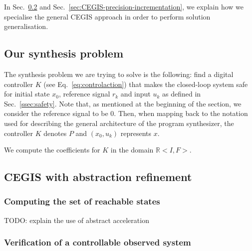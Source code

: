 \documentclass[runningheads,a4paper]{llncs}
\newcommand{\todo}[1]{{\color{red} TODO: #1}}
\begin{document}
In Sec.~\ref{sec:CEGIS-abstraction-refinement} and 
Sec.~\ref{sec:CEGIS-precision-incrementation}, we explain how we 
specialise the general CEGIS approach in order to perform solution generalisation.

\subsection{Our synthesis problem}
The synthesis problem we are trying to solve is the following:
find a digital controller $K$ (see Eq.~\ref{eq:controlaction})
that makes the closed-loop system safe for 
initial state $x_0$, reference signal $r_k$ and input $u_k$
as defined in Sec.~\ref{ssec:safety}. Note that, 
as mentioned at the beginning of the section, 
we consider the reference signal to be 0.
Then, when mapping back to the notation used for describing the general architecture 
of the program synthesizer, the controller $K$ denotes $P$ and 
$(x_0, u_k)$ represents $x$. 

We compute the coefficients for $K$ 
in the domain $\mathbb{R}<I,F>$.

\subsection{CEGIS with abstraction refinement}
\label{sec:CEGIS-abstraction-refinement}

\subsubsection{Computing the set of reachable states}
\todo{explain the use of abstract acceleration}

\subsubsection{Verification of a controllable observed system}
\label{sec:cof_verification}
\end{document}
